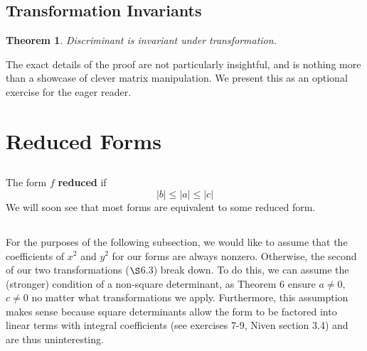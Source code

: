 \documentclass[12pt]{article}
\newtheorem{theorem}{Theorem}
\begin{document}
\subsection{Transformation Invariants}
\begin{theorem}
    Discriminant is invariant under transformation.
\end{theorem}
The exact details of the proof are not particularly insightful, and is nothing more than a showcase of clever matrix manipulation. We present this as an optional exercise for the eager reader.

\section{Reduced Forms}
\subsection{}
The form $f$ \textbf{reduced} if
\begin{equation}
    |b| \leq |a| \leq |c|
\end{equation}
We will soon see that most forms are equivalent to some reduced form.

\subsection{}
For the purposes of the following subsection, we would like to assume that the coefficients of $x^{2}$ and $y^{2}$ for our forms are always nonzero. Otherwise, the second of our two transformations ($\S$6.3) break down. To do this, we can assume the (stronger) condition of a non-square determinant, as Theorem 6 ensure $a \neq 0$, $c \neq 0$ no matter what transformations we apply. Furthermore, this assumption makes sense because square determinants allow the form to be factored into linear terms with integral coefficients (see exercises 7-9, Niven section 3.4) and are thus uninteresting.
\end{document}
